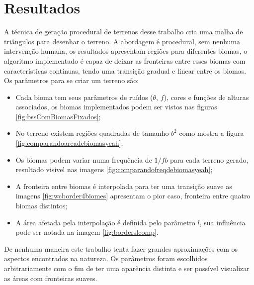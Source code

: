 \chapter{Resultados}
A técnica de geração procedural de terrenos desse trabalho cria uma 
malha de triângulos para desenhar o terreno. A abordagem é procedural, sem nenhuma 
intervenção humana, os resultados apresentam regiões para diferentes biomas, o
algoritmo implementado é capaz de deixar as fronteiras entre esses biomas com características 
contínuas, tendo uma transição gradual e linear entre os biomas.
Os parâmetros para se criar um terreno são:
\begin{itemize}
    \item Cada bioma tem seus parâmetros de ruídos ($\theta$, $f$), cores e funções de alturas associados, os
    biomas implementados podem ser vistos nas figuras \ref{fig:bssComBiomasFixados};
    \item No terreno existem regiões quadradas de tamanho $b^{2}$ como mostra a figura \ref{fig:comparandoareadebiomasyeah};
    \item Os biomas podem variar numa frequência de $1/fb$ para cada terreno
    gerado, resultado visível nas imagens \ref{fig:comparandofreqdebiomasyeah};
    \item A fronteira entre biomas é interpolada para ter uma transição suave as imagens \ref{fig:wcborder4biomes}
    apresentam o pior caso, fronteira entre quatro biomas distintos;
    \item A área afetada pela interpolação é definida pelo parâmetro $l$, sua influência 
    pode ser notada na imagem \ref{fig:borderslcomp}.
\end{itemize}

De nenhuma maneira este trabalho tenta fazer grandes aproximações
com os aspectos encontrados na natureza. Os parâmetros foram escolhidos arbitrariamente 
com o fim de ter uma aparência distinta e ser possível visualizar as áreas com fronteiras suaves.

